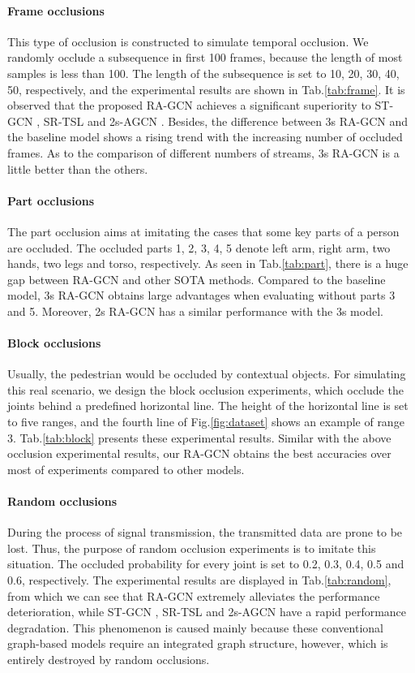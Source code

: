 \documentclass[journal]{IEEEtran}
\begin{document}
\paragraph{Frame occlusions} This type of occlusion is constructed to simulate temporal occlusion. We randomly occlude a subsequence in first 100 frames, because the length of most samples is less than 100. The length of the subsequence is set to 10, 20, 30, 40, 50, respectively, and the experimental results are shown in Tab.\ref{tab:frame}. It is observed that the proposed RA-GCN achieves a significant superiority to ST-GCN \cite{yan2018spatial}, SR-TSL \cite{si2018skeleton} and 2s-AGCN \cite{shi2019two}. Besides, the difference between 3s RA-GCN and the baseline model shows a rising trend with the increasing number of occluded frames. As to the comparison of different numbers of streams, 3s RA-GCN is a little better than the others.

\paragraph{Part occlusions} The part occlusion aims at imitating the cases that some key parts of a person are occluded. The occluded parts 1, 2, 3, 4, 5 denote left arm, right arm, two hands, two legs and torso, respectively. As seen in Tab.\ref{tab:part}, there is a huge gap between RA-GCN and other SOTA methods. Compared to the baseline model, 3s RA-GCN obtains large advantages when evaluating without parts 3 and 5. Moreover, 2s RA-GCN has a similar performance with the 3s model.

\paragraph{Block occlusions} Usually, the pedestrian would be occluded by contextual objects. For simulating this real scenario, we design the block occlusion experiments, which occlude the joints behind a predefined horizontal line. The height of the horizontal line is set to five ranges, and the fourth line of Fig.\ref{fig:dataset} shows an example of range 3. Tab.\ref{tab:block} presents these experimental results. Similar with the above occlusion experimental results, our RA-GCN obtains the best accuracies over most of experiments compared to other models.

\paragraph{Random occlusions} During the process of signal transmission, the transmitted data are prone to be lost. Thus, the purpose of random occlusion experiments is to imitate this situation. The occluded probability for every joint is set to 0.2, 0.3, 0.4, 0.5 and 0.6, respectively. The experimental results are displayed in Tab.\ref{tab:random}, from which we can see that RA-GCN extremely alleviates the performance deterioration, while ST-GCN \cite{yan2018spatial}, SR-TSL \cite{si2018skeleton} and 2s-AGCN \cite{shi2019two} have a rapid performance degradation. This phenomenon is caused mainly because these conventional graph-based models require an integrated graph structure, however, which is entirely destroyed by random occlusions.
\end{document}
